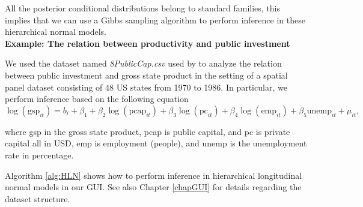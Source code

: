 All the posterior conditional distributions belong to standard families, this implies that we can use a Gibbs sampling algorithm to perform inference in these hierarchical normal models.\\

\textbf{Example: The relation between productivity and public investment}

We used the dataset named \textit{8PublicCap.csv} used by \cite{Ramirez2017} to analyze the relation  between public investment and gross state product in the setting of a spatial panel dataset consisting of 48 US states from 1970 to 1986.
In particular, we perform inference based on the following equation 
\begin{equation*}
	\log(\text{gsp}_{it})=b_i+\beta_1+\beta_2\log(\text{pcap}_{it})+\beta_3\log(\text{pc}_{it})+\beta_4\log(\text{emp}_{it})+\beta_5\text{unemp}_{it}+\mu_{it},
\end{equation*}

where gsp in the gross state product, pcap is public capital, and pc is private capital all in USD, emp is employment (people), and unemp is the unemployment rate in percentage.

Algorithm \ref{alg:HLN} shows how to perform inference in hierarchical longitudinal normal models in our GUI. See also Chapter \ref{chapGUI} for details regarding the dataset structure.

